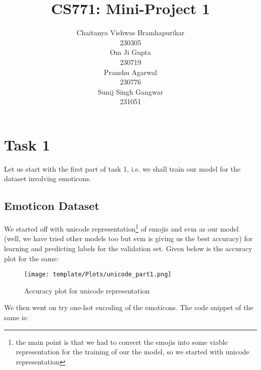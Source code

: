\documentclass{article} %
\title{CS771: Mini-Project 1}
\author{
Chaitanya Vishwas Bramhapurikar \\
230305\\
\And
Om Ji Gupta\\
230719\\
\AND
Pranshu Agarwal \\
230776 \\
\And
Sunij Singh Gangwar \\
231051 \\
}
\begin{document}
\maketitle

\section{Task 1}
Let us start with the first part of task 1, i.e. we shall train our model for the dataset involving emoticons. 

\subsection{Emoticon Dataset}
We started off with unicode representation\footnote{the main point is that we had to convert the emojis into some viable representation for the training of our the model, so we started with unicode representation} of emojis and svm as our model (well, we have tried other models too but svm is giving us the best accuracy) for learning and predicting labels for the validation set. Given below is the accuracy plot for the same:
\begin{figure} [htbp]
    \centering
    \texttt{[image: template/Plots/unicode\_part1.png]}
    \caption{Accuracy plot for unicode representation}
    \label{fig:1}
\end{figure}

We then went on try one-hot encoding of the emoticons. The code snippet of the same is: 
\end{document}
